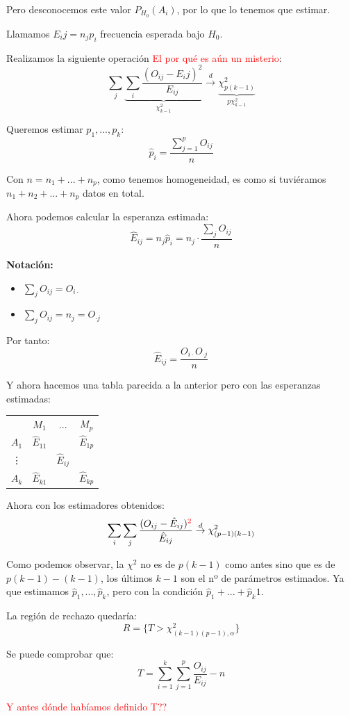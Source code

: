 \documentclass[nochap]{apuntes}
\begin{document}
Pero desconocemos este valor $P_{H_0}(A_i)$, por lo que lo tenemos que estimar.

Llamamos $E_ij =n_j p_i$ frecuencia esperada bajo $H_0$.

Realizamos la siguiente operación \textcolor{red}{El por qué es aún un misterio}:
$$ \sum_j \underbrace{\sum_i \frac{(O_{ij}-E_ij)^2}{E_{ij}}}_{\chi^2_{k-1}} \stackrel{d}{\rightarrow} \underbrace{\chi^2_{p(k-1)}}_{p\chi^2_{k-1}} $$

Queremos estimar $p_1,...,p_k$:
$$\hat{p}_i=\frac{\sum_{j=1}^p O_{ij}}{n}$$

Con $n=n_1+...+n_p$, como tenemos homogeneidad, es como si tuviéramos $n_1+n_2+...+n_p$ datos en total. 

Ahora podemos calcular la esperanza estimada:
$$\hat{E}_{ij} = n_j \hat{p}_i=n_j \cdot \frac{\sum_j O_{ij}}{n}$$

\textbf{Notación:} 
\begin{itemize}
\item $\sum_j O_{ij} = O_{i\cdot}$
\item $\sum_j O_{ij} = n_j =  O_{\cdot j}$
\end{itemize}
Por tanto:
$$\hat{E}_{ij} = \frac{O_{i\cdot} O_{\cdot j}}{n}$$

Y ahora hacemos una tabla parecida a la anterior pero con las esperanzas estimadas:

\begin{tabular}{cccc}
& $M_1$ & ... & $M_p$ \\
$A_1$ & $\hat{E}_{11}$ &  & $\hat{E}_{1p}$ \\
\vdots &  & $\hat{E}_{ij}$ &  \\
$A_k$ & $\hat{E}_{k1}$ &  & $\hat{E}_{kp}$ \\
\end{tabular}

Ahora con los estimadores obtenidos:
$$ \sum_i \sum_j \frac{(O_{ij}-\hat{E}_{ij})^{\textcolor{red}{2}}}{\hat{E}_{ij}} \stackrel{d}{\rightarrow} \chi^2_{(p-1)(k-1)} $$

Como podemos observar, la $\chi^2$ no es de $p(k-1)$ como antes sino que es de $p(k-1)-(k-1)$, los últimos $k-1$ son el nº de parámetros estimados. Ya que estimamos $\hat{p}_1,...,\hat{p}_k$, pero con la condición $\hat{p}_1+...+\hat{p}_k  1$.

La región de rechazo quedaría:
$$ R=\{T > \chi^2_{(k-1)(p-1),\alpha}\}$$

\begin{obs}
Se puede comprobar que:
$$ T = \sum_{i=1}^k \sum_{j=1}^p \frac{O_{ij}}{E_{ij}}-n$$

\textcolor{red}{Y antes dónde habíamos definido T??}
\end{obs}
\end{document}
